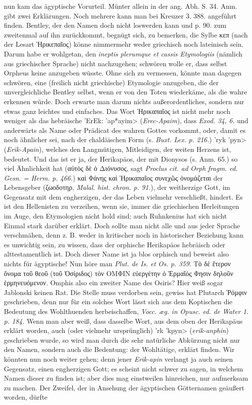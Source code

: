 \documentclass[a4paper, 11pt, oneside]{article}
\begin{document}
nun kam das ägyptische Vorurteil. Münter allein in der ang. Abh. S. 34. Anm. gibt zwei Erklärungen. Noch mehrere kann man bei Kreuzer 3. 388. angeführt finden. Bentley, der den Namen doch nicht loswerden kann und p. 90. zum zweitenmal auf ihn zurückkommt, begnügt sich, zu bemerken, die Sylbe κεπ (nach der Lesart Ἡρικεπαῖος) könne nimmermehr weder griechisch noch lateinisch sein. Darum habe er wohlgetan, den \emph{ineptis plerumque et cassis Etymologiis} (nämlich aus griechischer Sprache) nicht nachzugehen; schwören wolle er, dass selbst Orpheus keine anzugeben wüsste. Ohne sich zu vermessen, könnte man dagegen schwören, eine (freilich nicht griechische) Etymologie anzugeben, die der unvergleichliche Bentley selbst, wenn er von den Toten wiederkäme, als die wahre erkennen würde. Doch erwarte man darum nichts außerordentliches, sondern nur etwas ganz leichtes und einfaches. Das Wort Ἡρικαπαῖος ist nicht mehr noch weniger als das hebräische \foreignlanguage{hebrew}{\<'ErEk: 'ap*ayim>} (\emph{Erec-Apaim}), dass \emph{Exod. 34, 6.} und anderwärts als Name oder Prädicat des wahren Gottes vorkommt, oder, damit es noch ähnlicher sei, nach der chaldäischen Form (s. \emph{Buxt. Lex. p. 216.}) \foreignlanguage{hebrew}{\<'ryk 'pyn>} (\emph{Erik-Apain}), welches den Langmütigen, Mitleidigen, der weiten Herzens ist, bedeutet. Und das ist er ja, der Herikapäos, der mit Dionysos (s. Anm. 65.) so viel Ähnlichkeit hat (αὐτὸς δὲ ὁ Διόνυσος, sagt \emph{Proclus cit. ad Orph fragm. ed. Gesn. = Herm. p. 466.}) καὶ Φάνης καὶ Ἡρικαπαῖος συνεχῶς ὀνομάζεται der Lebensgeber (ζωοδοτηρ, \emph{Malal. hist. chron. p. 91.}), der weitherzige Gott, im Gegensatz mit dem engherzigen, der das Leben vielmehr verschließt, hindert. Es ist den Hellenisten zu verzeihen, wenn sie, immer die griechischen Herleitungen im Auge, den Etymologien nicht hold sind; auch Ruhnkenius hat sich nicht Einmal stark darüber erklärt. Doch sollte man nicht alle und aus jeder Sprache verschmähen, denn z. B. weder in kritischer noch in historischer Beziehung kann es unwichtig sein, zu wissen, dass der orphische Herikapäos hebräisch oder alttestamentlich ist. Doch dieser Name ist ja blos orphisch und beweist also nichts für ägyptische! Nun höre man \emph{Plut. de Is. et Os. p. 359.} Τὸ δὲ ἕτερον ὄνομα τοῦ θεοῦ (τοῦ Ὀσίριδος) τὸν ΟΜΦΙΝ εὐεργέτην ὁ Ἑρμαῖός Φησιν δηλοῦν ἑρμηνευόμενον. Omphis also ein zweiter Name des Osiris? Hier weiß sogar Jablonski keinen Rat. Die Stelle muss verdorben sein, gewiss hat Plutarch Ῥόμφιν geschrieben, denn nur für ein solches Wort lässt sich aus dem Koptischen die Bedeutung des Wohlthuenden herbeischaffen, \emph{Vocc. æg. in Opusc. ed. de Water 1. p. 184.} Wenn man aber weiß, dass dasselbe Wort, aus dem oben der Herikapäus erklärt worden, auch (oder vielmehr ursprünglich) \foreignlanguage{hebrew}{\<'rk 'kpyn>} (\emph{erik-anphin}) geschrieben wurde, so wird man durch die sehr natürliche Abkürzung nicht nur den Namen, sondern auch die Bedentung: der Wohltätige, erklärt finden. Wir könnten nun noch weiter gehen; denn jener \emph{Erik-apin} verlangt ja auch seinen Gegensatz, einen engherzigen Gott; es scheint nicht schwer zu sagen, in welchem Namen dieser zu finden ist; aber dies mag einstweilen hinreichen, nur aufmerksam zu machen. Der Zweifel, der in Ansehung der ägyptischen Götternamen geäußert worden, dürfte 
\end{document}
